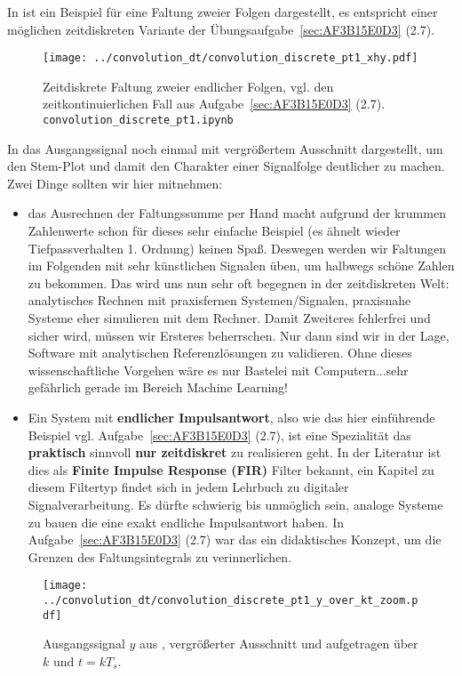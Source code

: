 In  ist ein Beispiel für eine Faltung
zweier Folgen dargestellt, es entspricht einer möglichen zeitdiskreten
Variante der Übungsaufgabe~\ref{sec:AF3B15E0D3} (2.7).
%
\begin{figure}[t]
\centering
\texttt{[image: ../convolution\_dt/convolution\_discrete\_pt1\_xhy.pdf]}
\caption{Zeitdiskrete Faltung zweier endlicher Folgen, vgl. den zeitkontinuierlichen
Fall aus Aufgabe~\ref{sec:AF3B15E0D3} (2.7). \texttt{convolution\_discrete\_pt1.ipynb}}
\label{fig:convolution_discrete_pt1_xhy}
\end{figure}
%
In  das Ausgangssignal noch
einmal mit vergrößertem Ausschnitt dargestellt, um den Stem-Plot und damit den
Charakter einer Signalfolge deutlicher zu machen.
%
Zwei Dinge sollten wir hier mitnehmen:
\begin{itemize}
\item das Ausrechnen der Faltungssumme per Hand macht aufgrund der krummen Zahlenwerte
schon für dieses sehr einfache Beispiel (es ähnelt wieder Tiefpassverhalten 1. Ordnung)
keinen Spaß.
Deswegen werden wir Faltungen im Folgenden mit sehr künstlichen Signalen
üben, um halbwegs schöne Zahlen zu bekommen. Das wird uns nun
sehr oft begegnen in der zeitdiskreten Welt:
analytisches Rechnen mit praxisfernen Systemen/Signalen,
praxisnahe Systeme eher simulieren mit dem Rechner. Damit Zweiteres fehlerfrei und
sicher wird, müssen wir Ersteres beherrschen. Nur dann sind wir in der
Lage, Software mit analytischen Referenzlösungen zu validieren.
Ohne dieses wissenschaftliche Vorgehen wäre es nur Bastelei mit Computern...sehr gefährlich gerade im Bereich Machine Learning!
\item Ein System mit \textbf{endlicher Impulsantwort}, also wie das hier einführende Beispiel
vgl. Aufgabe~\ref{sec:AF3B15E0D3} (2.7), ist eine Spezialität das
\textbf{praktisch} sinnvoll \textbf{nur zeitdiskret} zu realisieren geht. In der Literatur
ist dies als \textbf{Finite Impulse Response (FIR)} Filter bekannt, ein Kapitel
zu diesem Filtertyp findet sich in jedem Lehrbuch zu digitaler Signalverarbeitung.
Es dürfte schwierig bis unmöglich sein, analoge Systeme zu bauen die eine
exakt endliche Impulsantwort haben. In Aufgabe~\ref{sec:AF3B15E0D3} (2.7) war das ein didaktisches
Konzept, um die Grenzen des Faltungsintegrals zu verinnerlichen.
\end{itemize}
%
\begin{figure}[t]
\centering
\texttt{[image: ../convolution\_dt/convolution\_discrete\_pt1\_y\_over\_kt\_zoom.pdf]}
\caption{Ausgangssignal $y$ aus ,
vergrößerter Ausschnitt und aufgetragen über $k$ und $t=k T_s$.}
\label{fig:convolution_discrete_pt1_y_over_kt_zoom}
\end{figure}

